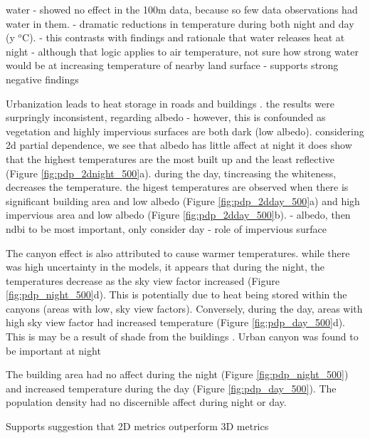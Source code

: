 \documentclass[final,3p,times,twocolumn,sort&compress]{elsarticle}
\begin{document}
water
- showed no effect in the 100m data, because so few data observations had water in them.
- dramatic reductions in temperature during both night and day (y $^o$C).
- this contrasts with findings and rationale that water releases heat at night \cite{Chun2017-mm} - although that logic applies to air temperature, not sure how strong water would be at increasing temperature of nearby land surface
- supports strong negative findings \cite{Wang2019-water}

Urbanization leads to heat storage in roads and buildings \cite{Zhou2014-wc, Voogt2003-mm}. 
the results were surpringly inconsistent, regarding albedo - however, this is confounded as vegetation and highly impervious surfaces are both dark (low albedo).
considering 2d partial dependence, we see that albedo has little affect at night it does show that the highest temperatures are the most built up and the least reflective (Figure \ref{fig:pdp_2dnight_500}a).
during the day, tincreasing the whiteness, decreases the temperature. the higest temperatures are observed when there is significant building area and low albedo (Figure \ref{fig:pdp_2dday_500}a) and high impervious area and low albedo (Figure \ref{fig:pdp_2dday_500}b).
- albedo, then ndbi to be most important, only consider day \cite{Peng2018-cp}
- role of impervious surface \cite{Lu2006-ch}



The canyon effect is also attributed to cause warmer temperatures. \cite{Chun2017-mm,Oke1988-re}
while there was high uncertainty in the models, it appears that during the night, the temperatures decrease as the sky view factor increased (Figure \ref{fig:pdp_night_500}d).
This is potentially due to heat being stored within the canyons (areas with low, sky view factors).
Conversely, during the day, areas with high sky view factor had increased temperature (Figure \ref{fig:pdp_day_500}d).
This is may be a result of shade from the buildings \cite{Yu2019-ps}.
Urban canyon was found to be important at night \cite{Chun2017-mm}



The building area had no affect during the night (Figure \ref{fig:pdp_night_500}) and increased temperature during the day (Figure \ref{fig:pdp_day_500}).
The population density had no discernible affect during night or day.



Supports suggestion that 2D metrics outperform 3D metrics \cite{Berger2017-lx}
\end{document}
